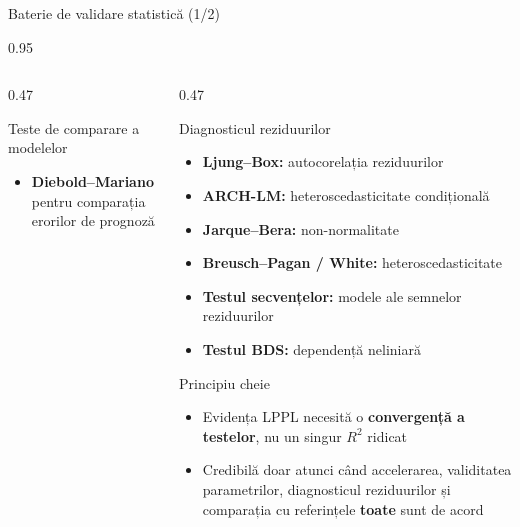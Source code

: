 \documentclass[9pt, aspectratio=169, t]{beamer}
\begin{document}
\begin{frame}{Baterie de validare statistică (1/2)}
\begin{cminipage}{0.95\textwidth}
{\begin{columns}[T]
\begin{column}{0.47\textwidth}
\begin{alertblock}{Teste de comparare a modelelor}
\begin{itemize}
                    \item \textbf{Diebold--Mariano} pentru comparația erorilor de prognoză
                \end{itemize}
            \end{alertblock}
        \end{column}
        \begin{column}{0.47\textwidth}
            \begin{exampleblock}{Diagnosticul reziduurilor}
                \begin{itemize}\setlength{\itemsep}{0pt}
                    \item \textbf{Ljung--Box:} autocorelația reziduurilor
                    \item \textbf{ARCH-LM:} heteroscedasticitate condițională
                    \item \textbf{Jarque--Bera:} non-normalitate
                    \item \textbf{Breusch--Pagan / White:} heteroscedasticitate
                    \item \textbf{Testul secvențelor:} modele ale semnelor reziduurilor
                    \item \textbf{Testul BDS:} dependență neliniară
                \end{itemize}
            \end{exampleblock}
            \vspace{-2mm}
            \begin{block}{Principiu cheie}
                \begin{itemize}\setlength{\itemsep}{0pt}
                    \item Evidența LPPL necesită o \textbf{convergență a testelor}, nu un singur $R^2$ ridicat
                    \item Credibilă doar atunci când accelerarea, validitatea parametrilor, diagnosticul reziduurilor și comparația cu referințele \textbf{toate} sunt de acord
                \end{itemize}
            \end{block}
        \end{column}
    \end{columns}
    }
    \end{cminipage}
\end{frame}
\end{document}
